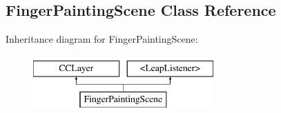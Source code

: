 \hypertarget{interface_finger_painting_scene}{\subsection{Finger\-Painting\-Scene Class Reference}
\label{dd/df0/interface_finger_painting_scene}
}
Inheritance diagram for Finger\-Painting\-Scene\-:\begin{figure}[H]
\begin{center}
\leavevmode
\includegraphics[height=2.000000cm]{dd/df0/interface_finger_painting_scene}
\end{center}
\end{figure}
